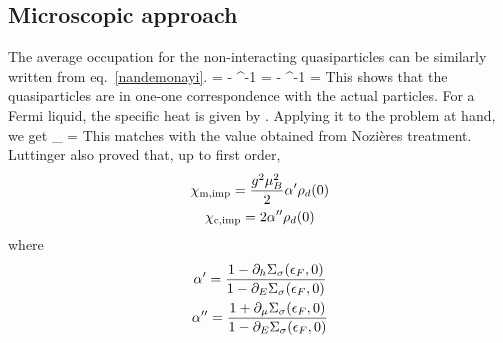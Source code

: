 \documentclass[14pt]{extarticle}
\numberwithin{equation}{section}
\begin{document}
\subsection{Microscopic approach}
The average occupation for the non-interacting quasiparticles can be similarly written from eq.~\ref{nandemonayi}.
\beq
{} = - \tan^{-1} =  - \tan^{-1} =  
\eeq
This shows that the quasiparticles are in one-one correspondence with the actual particles. For a Fermi liquid, the specific heat is given by . Applying it to the problem at hand, we get
\beq[eren]
\gamma_ = 
\eeq
This matches with the value obtained from Nozières treatment. Luttinger also proved that, up to first order,
\begin{gather}
	\chi_\text{m,imp} = \frac{g^2 \mu_B^2}{2}\alpha^\prime \rho_d(0)\\\label{mikasa}
\chi_\text{c,imp} = 2\alpha^{\prime\prime}\rho_d(0)
\end{gather}
where
\begin{gather}
\alpha^\prime = \frac{1-\partial_h\Sigma_\sigma(\epsilon_F,0)}{1-\partial_E\Sigma_\sigma(\epsilon_F,0)}\\
\alpha^{\prime\prime}=\frac{1+\partial_\mu\Sigma_\sigma(\epsilon_F,0)}{1-\partial_E\Sigma_\sigma(\epsilon_F,0)}
\end{gather}
\end{document}
